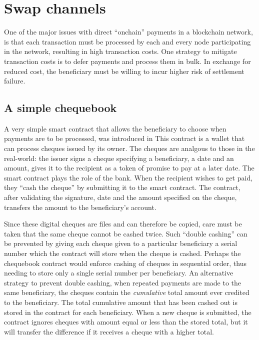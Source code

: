 
\section{Swap channels}

One of the major issues with direct ``onchain'' payments in a blockchain network, is that each transaction must be processed
by each and every node participating in the network, resulting in high transaction costs.
One strategy to mitigate transaction costs is to defer payments and process them in bulk. 
In exchange for reduced cost, the beneficiary must be willing to incur higher risk of settlement failure.

\subsection{A simple chequebook}

A very simple smart contract that allows the beneficiary to choose when payments are to be processed, was introduced in \cite{ethersphere2016sw3}
This  contract is a wallet that can process cheques issued by its owner. The cheques are
analgous to those in the real-world: the issuer signs a cheque specifying a beneficiary, a date and an amount,
gives it to the recipient as a token of promise to pay at a later date. The smart contract plays the
role of the bank. When the recipient wishes to get paid, they ``cash the cheque'' by submitting it to the smart contract. The contract, after validating the signature, date and the amount specified on the cheque, transfers the amount to the beneficiary's account.

Since these digital cheques are files and can therefore be copied, care must be taken that the same cheque cannot be cashed twice. Such ``double cashing'' can be prevented by giving each cheque given to a particular beneficiary a serial number which the contract will store when the cheque is cashed. Perhaps the chequebook contract would enforce cashing of cheques in sequential order, thus needing to store only a single serial number per beneficiary.
An alternative strategy to prevent double cashing, when repeated payments are made to the same beneficiary, the cheques contain the \emph{cumulative} total amount ever credited to the beneficiary. The total cumulative amount that has been cashed out is stored in the contract for each beneficiary. When a new cheque is submitted, the contract ignores cheques with amount equal or less than the stored total, but it will transfer the difference if it receives a cheque with a higher
total.

